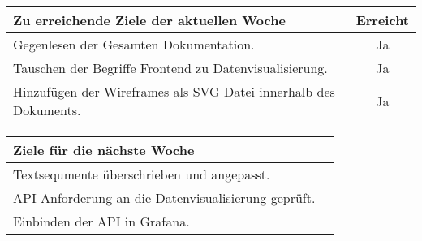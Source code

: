\begin{tabularx}{\textwidth}{Xc}
    \arrayrulecolor{OliveGreen}
    \toprule
    {\bfseries Zu erreichende Ziele der aktuellen Woche} & {\bfseries Erreicht} \\
    \midrule[2pt]
    Gegenlesen der Gesamten Dokumentation.                   &Ja              \\
    \rowcolor{OliveGreen!15}
    Tauschen der Begriffe Frontend zu Datenvisualisierung.   &Ja              \\
    \rowcolor{White}
    Hinzufügen der Wireframes als SVG Datei innerhalb des Dokuments.  &Ja     \\
    \bottomrule[2pt]
\end{tabularx}
%
\vspace{1cm}
%
\begin{tabularx}{\textwidth}{Xc}
    \arrayrulecolor{OliveGreen}
    \toprule
    {\bfseries Ziele für die nächste Woche}        &                         \\
    \midrule[2pt]
    Textsequmente überschrieben und angepasst.      &                         \\
    \rowcolor{OliveGreen!15}
    API Anforderung an die Datenvisualisierung geprüft.    &                  \\
    \rowcolor{White}
    Einbinden der API in Grafana.                   &                         \\
\end{tabularx}
